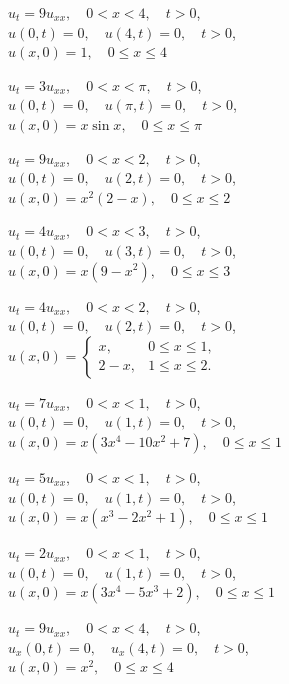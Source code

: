 \begin{exerciselist}
\item\label{exer:12.1.9}$u_t=9u_{xx},\quad 0<x<4,\quad t>0$,\\
$u(0,t)=0,\quad u(4,t)=0,\quad t>0$,\\
$u(x,0)=1,\quad 0\le x\le 4$

\item\label{exer:12.1.10}$u_t=3u_{xx},\quad 0<x<\pi,\quad t>0$,\\
$u(0,t)=0,\quad u(\pi,t)=0,\quad t>0$,\\
$u(x,0)=x\sin x,\quad 0\le x\le \pi$


\item\label{exer:12.1.11}\Cex
$u_t=9u_{xx},\quad 0<x<2,\quad t>0$,\\
$u(0,t)=0,\quad u(2,t)=0,\quad t>0$,\\
$u(x,0)=x^2(2-x),\quad 0\le x\le 2$


\item\label{exer:12.1.12}$u_t=4u_{xx},\quad 0<x<3,\quad t>0$,\\
$u(0,t)=0,\quad u(3,t)=0,\quad t>0$,\\
$u(x,0)=x(9-x^2),\quad 0\le x\le 3$

\item\label{exer:12.1.13}$u_t=4u_{xx},\quad 0<x<2,\quad t>0$,\\
$u(0,t)=0,\quad u(2,t)=0,\quad t>0$,\\
$u(x,0)=
\begin{cases}
x,&0\le x\le1,\\2-x,&1\le x\le 2.
\end{cases}$


\item\label{exer:12.1.14}$u_t=7u_{xx},\quad 0<x<1,\quad t>0$,\\
$u(0,t)=0,\quad u(1,t)=0,\quad t>0$,\\
$u(x,0)=x(3x^4-10x^2+7),\quad 0\le x\le 1$

\item\label{exer:12.1.15}$u_t=5u_{xx},\quad 0<x<1,\quad t>0$,\\
$u(0,t)=0,\quad u(1,t)=0,\quad t>0$,\\
$u(x,0)=x(x^3-2x^2+1),\quad 0\le x\le 1$

\item\label{exer:12.1.16}$u_t=2u_{xx},\quad 0<x<1,\quad t>0$,\\
$u(0,t)=0,\quad u(1,t)=0,\quad t>0$,\\
$u(x,0)=x(3x^4-5x^3+2),\quad 0\le x\le 1$

\item\label{exer:12.1.17}\Cex
$u_t=9u_{xx},\quad 0<x<4,\quad t>0$,\\
$u_x(0,t)=0,\quad u_x(4,t)=0,\quad t>0$,\\
$u(x,0)=x^2,\quad 0\le x\le 4$



\end{exerciselist}
